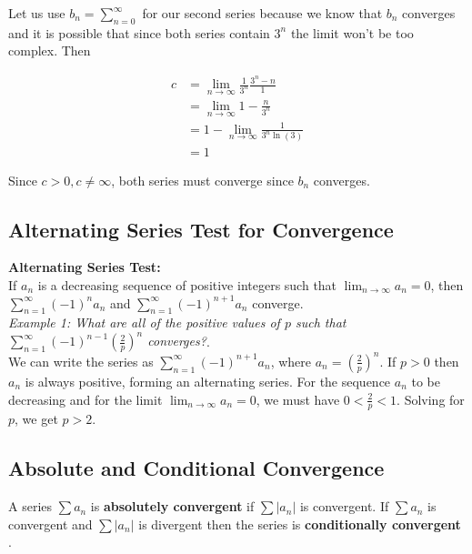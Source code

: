         \noindent Let us use $b_n=\sum^\infty_{n=0}$ for our second series because we know that $b_n$
        converges and it is possible that since both series contain $3^n$ the limit won't be too
        complex. Then

        \begin{align*}
            c   &= \lim_{n\to\infty} \frac{1}{3^n}\frac{3^n-n}{1} \\
                &= \lim_{n\to\infty} 1-\frac{n}{3^n} \\
                &= 1-\lim_{n\to\infty} \frac{1}{3^n\ln{(3)}} \\
                &= 1
        \end{align*}

        \noindent Since $c>0,c\not=\infty$, both series must converge since $b_n$ converges.


    \subsection{Alternating Series Test for Convergence}
        \color{purple} \textbf{Alternating Series Test:} \color{black} \\
        If $a_n$ is a decreasing sequence of positive integers such that $\lim_{n\to\infty}a_n=0$,
        then $\sum^\infty_{n=1}(-1)^n a_n$ and $\sum^\infty_{n=1} (-1)^{n+1}a_n$ converge. \\

        \noindent \color{blue} \textit{Example 1: What are all of the positive values of $p$ such
        that $\sum^\infty_{n=1}(-1)^{n-1}\left(\frac{2}{p}\right)^n$ converges?}. \color{black} \\

        \noindent We can write the series as $\sum^\infty_{n=1}(-1)^{n+1}a_n$, where
        $a_n=\left(\frac{2}{p}\right)^n$. If $p>0$ then $a_n$ is always positive, forming an
        alternating series. For the sequence $a_n$ to be decreasing and for the limit
        $\lim_{n\to\infty}a_n=0$, we must have $0<\frac{2}{p}<1$. Solving for $p$, we get $p>2$.

    \subsection{Absolute and Conditional Convergence}
        A series $\sum a_n$ is \color{purple} \textbf{absolutely convergent} \color{black} if
        $\sum |a_n|$ is convergent. If $\sum a_n$ is convergent and $\sum |a_n|$ is divergent
        then the series is \color{purple} \textbf{conditionally convergent} \color{black}. \\


